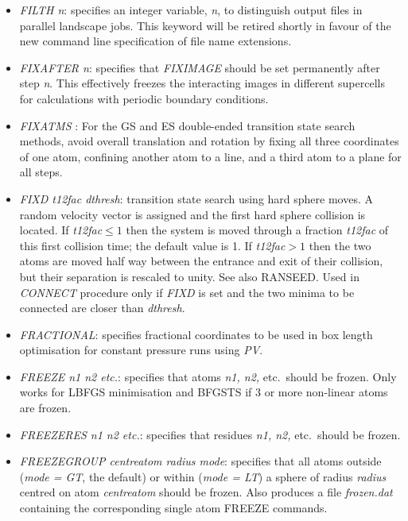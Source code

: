 \documentclass[12pt,a4paper,dvips]{article}
\begin{document}
\begin{itemize}
\item {\it FILTH n\/}: specifies an integer variable, {\it n}, to distinguish output files in
parallel landscape jobs. This keyword will be retired shortly in favour of the new
command line specification of file name extensions.

\item {\it FIXAFTER n\/}: specifies that {\it FIXIMAGE\/} should be set permanently after step      
      {\it n\/}. This effectively freezes the interacting images in different supercells
      for calculations with periodic boundary conditions.

\item {\it FIXATMS \/}: For the GS and ES double-ended transition state search
  methods, avoid overall translation and rotation by fixing all three
  coordinates of one atom, confining another atom to a line, and a third atom
  to a plane for all steps.

\item {\it FIXD t12fac dthresh\/}: transition state search using hard sphere moves. A random
velocity vector is assigned and the first hard sphere collision is located. If {\it t12fac\/}$\le1$
then the system is moved through a fraction {\it t12fac\/} of this first collision time; the
default value is 1. If 
{\it t12fac\/}$>1$ then the two atoms are moved half way between the entrance and exit of their
collision, but their separation is rescaled to unity. See also RANSEED.
Used in {\it CONNECT\/} procedure only if {\it FIXD\/} is set and the two
minima to be connected are closer than {\it dthresh}.

\item {\it FRACTIONAL\/}: specifies fractional coordinates to be used in box length
      optimisation for constant pressure runs using {\it PV\/}.

\item {\it FREEZE n1 n2 etc.\/}: specifies that atoms {\it n1, n2,\/} etc.~should be frozen.
Only works for LBFGS minimisation and BFGSTS if 3 or more non-linear atoms are frozen.

\item {\it FREEZERES n1 n2 etc.\/}: specifies that residues {\it n1, n2,\/} etc.~should be frozen.

\item {\it FREEZEGROUP centreatom radius mode\/}: specifies that all atoms outside ({\it mode = GT\/}, the default) 
or within ({\it mode = LT\/}) a sphere of radius {\it radius\/} centred on atom {\it centreatom\/} should be frozen.
Also produces a file {\it frozen.dat\/} containing the corresponding single atom FREEZE commands. 


\end{itemize}
\end{document}
